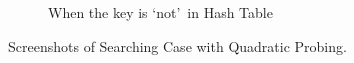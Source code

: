 \begin{itemize}
\begin{figure}[!ht]
\begin{subfigure}{0.45\textwidth}
			      \caption{When the key is `not'~in Hash Table}\label{fig:quadprobing-notfound-metric}
		      \end{subfigure}

		      \caption{Screenshots of Searching Case with Quadratic Probing.}\label{fig:quadprobing-search-metric}
	      \end{figure}
\end{itemize}